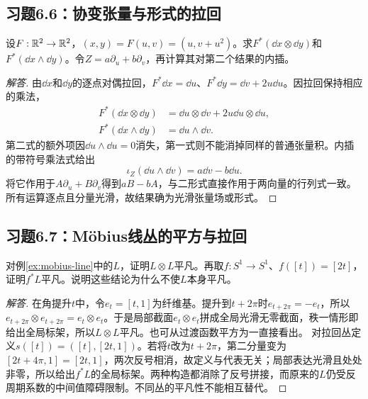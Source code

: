 \subsection*{习题6.6：协变张量与形式的拉回}
设$F:\mathbb{R}^2\to\mathbb{R}^2$，$(x,y)=F(u,v)=(u,v+u^2)$。求$F^*(\dd x\otimes\dd y)$和$F^*(\dd x\wedge\dd y)$。令$Z=a\partial_u+b\partial_v$，再计算其对第二个结果的内插。
\begin{proof}[解答]
由$\dd x$和$\dd y$的逐点对偶拉回，$F^*\dd x=\dd u$、$F^*\dd y=\dd v+2u\dd u$。因拉回保持相应的乘法，
\begin{align*}
 F^*(\dd x\otimes\dd y)&=\dd u\otimes\dd v+2u\dd u\otimes\dd u,\\
 F^*(\dd x\wedge\dd y)&=\dd u\wedge\dd v.
\end{align*}
第二式的额外项因$\dd u\wedge\dd u=0$消失，第一式则不能消掉同样的普通张量积。内插的带符号乘法式给出
\[
 \iota_Z(\dd u\wedge\dd v)=a\dd v-b\dd u.
\]
将它作用于$A\partial_u+B\partial_v$得到$aB-bA$，与二形式直接作用于两向量的行列式一致。所有运算逐点且分量光滑，故结果确为光滑张量场或形式。
\end{proof}

\subsection*{习题6.7：Möbius线丛的平方与拉回}
对例\ref{ex:mobius-line}中的$L$，证明$L\otimes L$平凡。再取$f:S^1\to S^1$、$f([t])=[2t]$，证明$f^*L$平凡。说明这些结论为什么不使$L$本身平凡。
\begin{proof}[解答]
在角提升$t$中，令$e_t=[t,1]$为纤维基。提升到$t+2\pi$时$e_{t+2\pi}=-e_t$，所以$e_{t+2\pi}\otimes e_{t+2\pi}=e_t\otimes e_t$。于是局部截面$e_t\otimes e_t$拼成全局光滑无零截面，秩一情形即给出全局标架，所以$L\otimes L$平凡。也可从过渡函数平方为一直接看出。
对拉回丛定义$s([t])=([t],[2t,1])$。若将$t$改为$t+2\pi$，第二分量变为$[2t+4\pi,1]=[2t,1]$，两次反号相消，故定义与代表无关；局部表达光滑且处处非零，所以给出$f^*L$的全局标架。两种构造都消除了反号拼接，而原来的$L$仍受反周期系数的中间值障碍限制。不同丛的平凡性不能相互替代。
\end{proof}

